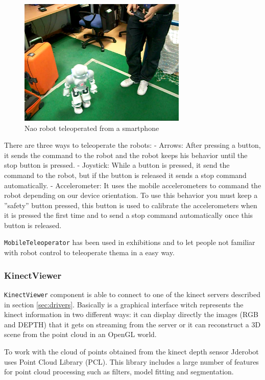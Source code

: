 \documentclass[twocolumn]{svjour3}          %
\begin{document}
\begin{figure}[h!]
  \includegraphics[width=8cm]{figs/teleoperator-nao.png}
\caption{Nao robot teleoperated from a smartphone}
\label{fig:nao-teleoperator}
\end{figure}

There are three ways to teleoperate the robots:
- Arrows: After pressing a button, it sends the command to the robot and the robot keeps his behavior until the stop button is pressed.
- Joystick: While a button is pressed, it send the command to the robot, but if the button is released it sends a stop command automatically.
- Accelerometer: It uses the mobile accelerometers to command the robot depending on our device orientation. To use this behavior you must keep a ''safety'' button pressed, this button is used to calibrate the accelerometers when it is pressed the first time and to send a stop command automatically once this button is released.

\texttt{MobileTeleoperator} has been used in exhibitions and to let people not familiar with robot control to teleoperate thema in a easy way.

\subsubsection{KinectViewer}

\texttt{KinectViewer} component is able to connect to one of the kinect servers described in section \ref{sec:drivers}. Basically is a graphical interface witch represents the kinect information in two different ways: it can display directly the images (RGB and DEPTH) that it gets on streaming from the server or it can reconstruct a 3D scene from the point cloud in an OpenGL world. 

To work with the cloud of points obtained from the kinect depth sensor Jderobot uses Point Cloud Library (PCL). This library includes a large number of features for point cloud processing such as filters, model fitting and segmentation. 
\end{document}
